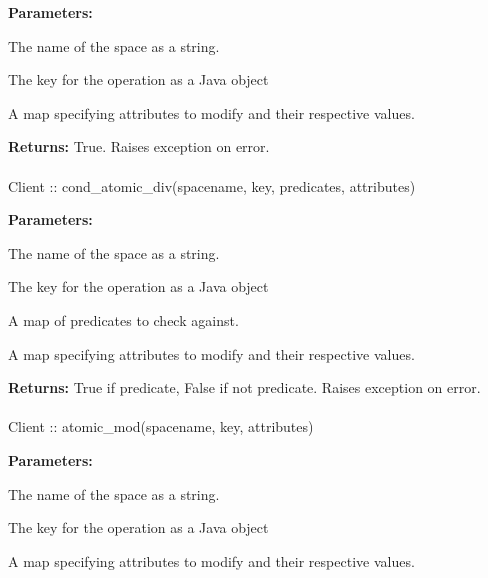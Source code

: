 \noindent\textbf{Parameters:}
\begin{description}[labelindent=\widthof{{\code{attributes}}},leftmargin=*,noitemsep,nolistsep,align=right]
\item[\code{spacename}] The name of the space as a string.
\item[\code{key}] The key for the operation as a Java object
\item[\code{attributes}] A map specifying attributes to modify and their respective values.
\end{description}

\noindent\textbf{Returns:}
True.  Raises exception on error.

\paragraph{}
\label{api:java:cond_atomic_div}
\begin{javacode}
Client :: cond_atomic_div(spacename, key, predicates, attributes)
\end{javacode}
\funcdesc 

\noindent\textbf{Parameters:}
\begin{description}[labelindent=\widthof{{\code{predicates}}},leftmargin=*,noitemsep,nolistsep,align=right]
\item[\code{spacename}] The name of the space as a string.
\item[\code{key}] The key for the operation as a Java object
\item[\code{predicates}] A map of predicates to check against.
\item[\code{attributes}] A map specifying attributes to modify and their respective values.
\end{description}

\noindent\textbf{Returns:}
True if predicate, False if not predicate.  Raises exception on error.

\paragraph{}
\label{api:java:atomic_mod}
\begin{javacode}
Client :: atomic_mod(spacename, key, attributes)
\end{javacode}
\funcdesc 

\noindent\textbf{Parameters:}
\begin{description}[labelindent=\widthof{{\code{attributes}}},leftmargin=*,noitemsep,nolistsep,align=right]
\item[\code{spacename}] The name of the space as a string.
\item[\code{key}] The key for the operation as a Java object
\item[\code{attributes}] A map specifying attributes to modify and their respective values.
\end{description}

